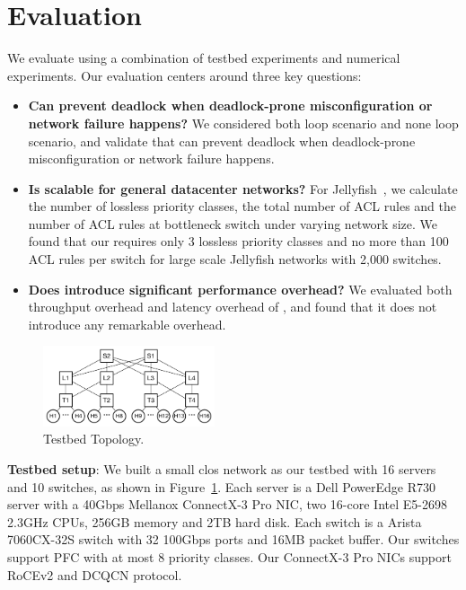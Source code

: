 \section{Evaluation}\label{sec:eval}

We evaluate \sysname{} using a combination of testbed experiments and numerical experiments. Our evaluation centers around three key questions:

\begin{itemize}
	\item \textbf{Can \sysname{} prevent deadlock when deadlock-prone misconfiguration or network failure happens?} We considered both loop scenario and none loop scenario, and validate that \sysname{} can prevent deadlock when deadlock-prone misconfiguration or network failure happens.
	
	\item \textbf{Is \sysname{} scalable for general datacenter networks?}  For Jellyfish~\cite{jellyfish}, we calculate the  number of lossless priority classes, the total number of ACL rules and the number of ACL rules at bottleneck switch under varying network size. We found that our \sysname{} requires only 3 lossless priority classes and no more than 100 ACL rules per switch for large scale Jellyfish networks with 2,000 switches. 
	
	\item \textbf{Does \sysname{} introduce significant performance overhead?} We evaluated both throughput overhead and latency overhead of \sysname{}, and found that it does not introduce any remarkable overhead.
	
	
\end{itemize}

\begin{figure}
	\centering
	\includegraphics[width=0.45\textwidth] {figs/testbed_topo}
	\caption{Testbed Topology.}\label{fig:testbed_topo}
	
\end{figure}



\textbf{Testbed setup}: We built a small clos network as our testbed with 16 servers and 10 switches, as shown in Figure~\ref{fig:testbed_topo}. Each server is a Dell PowerEdge R730 server with a 40Gbps Mellanox ConnectX-3 Pro NIC, two 16-core Intel E5-2698 2.3GHz CPUs, 256GB memory and 
2TB hard disk. Each switch is a Arista 7060CX-32S switch with 32 100Gbps ports and 16MB packet buffer. Our switches support
PFC with at most 8 priority classes. Our ConnectX-3 Pro NICs support RoCEv2 and DCQCN protocol.


